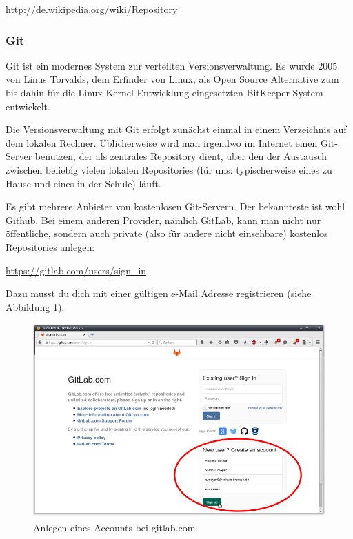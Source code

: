 \url{http://de.wikipedia.org/wiki/Repository}

\subsubsection{Git}

Git ist ein modernes System zur verteilten Versionsverwaltung. Es wurde 2005 von
Linus Torvalds, dem Erfinder von Linux, als Open Source Alternative zum bis
dahin für die Linux Kernel Entwicklung eingesetzten BitKeeper System entwickelt.

Die Versionsverwaltung mit Git erfolgt zunächst einmal in einem Verzeichnis auf
dem lokalen Rechner. Üblicherweise wird man irgendwo im Internet einen
Git-Server benutzen, der als zentrales Repository dient, über den der Austausch
zwischen beliebig vielen lokalen Repositories (für uns: typischerweise eines zu
Hause und eines in der Schule) läuft.

Es gibt mehrere Anbieter von kostenlosen Git-Servern. Der bekannteste ist
wohl Github. Bei einem anderen Provider, nämlich GitLab, kann man nicht nur
öffentliche, sondern auch private (also für andere nicht einsehbare) kostenlos Repositories
anlegen:

\url{https://gitlab.com/users/sign_in}

Dazu musst du dich mit einer gültigen e-Mail Adresse registrieren (siehe
Abbildung \ref{fig:gitlab-account-creation}).

\begin{figure}[h]
  \centering
   \includegraphics[width=1.0\textwidth]{./inf/SEKII/01_Vorbereitung/GitLab_Account_Creation.png}
   \caption{Anlegen eines Accounts bei gitlab.com}
   \label{fig:gitlab-account-creation}
\end{figure}

